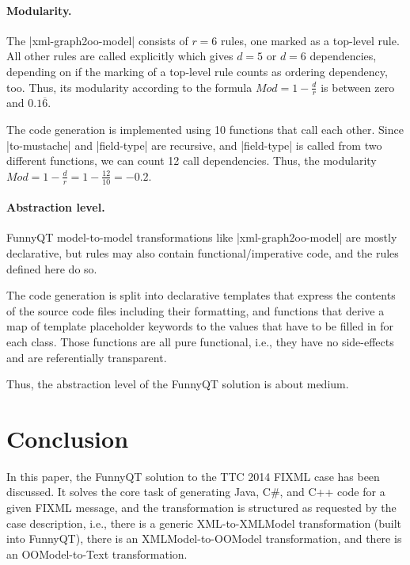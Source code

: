 \documentclass[a4paper]{article}
\newcommand{\code}{\clojureinline}
\begin{document}
\paragraph{Modularity.}
\label{sec:modularity}

The \code|xml-graph2oo-model| consists of \(r=6\)
rules, one marked as a top-level rule.  All other rules are called explicitly
which gives \(d=5\)
or \(d=6\)
dependencies, depending on if the marking of a top-level rule counts as
ordering dependency, too.  Thus, its modularity according to the formula
\(Mod = 1 - \frac{d}{r}\) is between zero and \(0.1\overline{6}\).

The code generation is implemented using 10 functions that call each other.
Since \code|to-mustache| and \code|field-type| are recursive, and
\code|field-type| is called from two different functions, we can count 12 call
dependencies.  Thus, the modularity
\(Mod = 1 - \frac{d}{r} = 1 - \frac{12}{10} = -0.2\).


\paragraph{Abstraction level.}
\label{sec:abstraction-level}

FunnyQT model-to-model transformations like \code|xml-graph2oo-model| are
mostly declarative, but rules may also contain functional/imperative code, and
the rules defined here do so.

The code generation is split into declarative templates that express the
contents of the source code files including their formatting, and functions
that derive a map of template placeholder keywords to the values that have to
be filled in for each class.  Those functions are all pure functional, i.e.,
they have no side-effects and are referentially transparent.

Thus, the abstraction level of the FunnyQT solution is about medium.


\section{Conclusion}
\label{sec:conclusion}

In this paper, the FunnyQT solution to the TTC 2014 FIXML case has been
discussed.  It solves the core task of generating Java, C\#, and C++ code for a
given FIXML message, and the transformation is structured as requested by the
case description, i.e., there is a generic XML-to-XMLModel transformation
(built into FunnyQT), there is an XMLModel-to-OOModel transformation, and there
is an OOModel-to-Text transformation.
\end{document}
